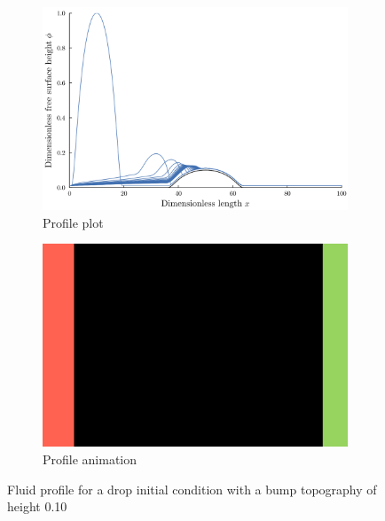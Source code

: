 \begin{frame}
    \begin{figure}
        \centering
        \begin{subfigure}[ht]{.5\textwidth}
            \includegraphics[width=\textwidth]{images/bump_10_shorter/plt_notitle.png}
            \caption{Profile plot}
            \label{fig:drop_10_profile}
        \end{subfigure}%
        \begin{subfigure}[ht]{.5\textwidth}
            \includegraphics[width=\textwidth]{images/placeholder.png}
            \caption{Profile animation}
            \label{fig:drop_10_anim}
        \end{subfigure} 
        \caption{Fluid profile for a drop initial condition with a bump topography of height 0.10} 
    \end{figure}
\end{frame} 
